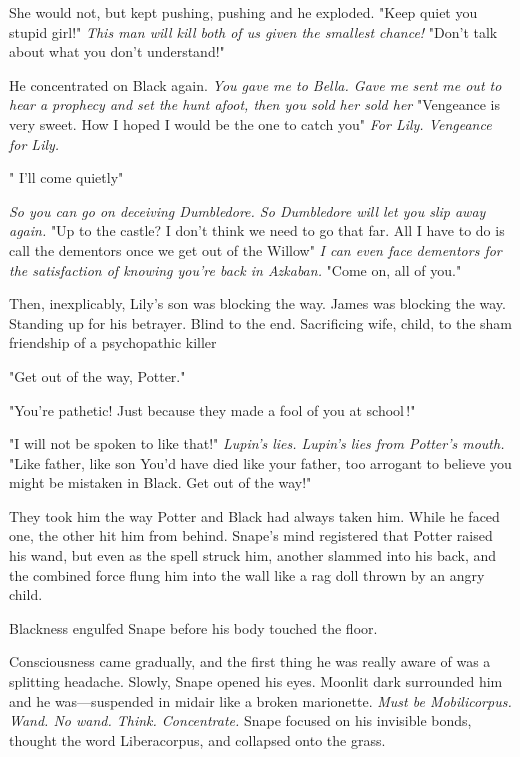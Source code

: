 She would not, but kept pushing, pushing{\el} and he exploded. "Keep quiet you stupid girl!" \emph{This man will kill both of us given the smallest chance!} "Don't talk about what you don't understand!"

He concentrated on Black again. \emph{You gave me to Bella. Gave me{\el} sent me out to hear a prophecy and set the hunt afoot, then you sold her{\el} sold her{\el}} "Vengeance is very sweet. How I hoped I would be the one to catch you{\el}" \emph{For Lily. Vengeance for Lily.}

"{\el} I'll come quietly{\el}"

\emph{So you can go on deceiving Dumbledore. So Dumbledore will let you slip away again.} "Up to the castle? I don't think we need to go that far. All I have to do is call the dementors once we get out of the Willow{\el}" \emph{I can even face dementors for the satisfaction of knowing you're back in Azkaban.} "Come on, all of you."

Then, inexplicably, Lily's son was blocking the way. James was blocking the way. Standing up for his betrayer. Blind to the end. Sacrificing wife, child, to the sham friendship of a psychopathic killer{\el}

"Get out of the way, Potter."

"You're pathetic! Just because they made a fool of you at school{\el}\,!"

"I will not be spoken to like that!" \emph{Lupin's lies. Lupin's lies from Potter's mouth.} "Like father, like son{\el} You'd have died like your father, too arrogant to believe you might be mistaken in Black. Get out of the way!"

They took him the way Potter and Black had always taken him. While he faced one, the other hit him from behind. Snape's mind registered that Potter raised his wand, but even as the spell struck him, another slammed into his back, and the combined force flung him into the wall like a rag doll thrown by an angry child.

Blackness engulfed Snape before his body touched the floor.

\sbreak

Consciousness came gradually, and the first thing he was really aware of was a splitting headache. Slowly, Snape opened his eyes. Moonlit dark surrounded him and he was—suspended in midair like a broken marionette. \emph{Must be{\el} Mobilicorpus. Wand. No wand. Think. Concentrate.} Snape focused on his invisible bonds, thought the word Liberacorpus, and collapsed onto the grass.

